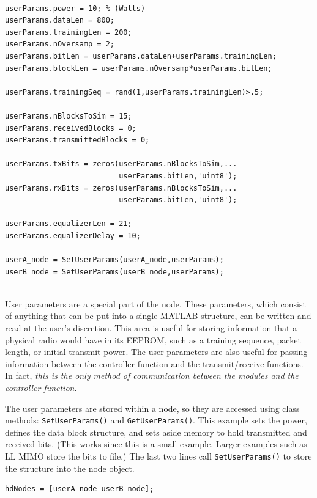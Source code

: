 \begin{lstlisting}[name=hdBuildNodes]
% Set user parameters

userParams.power = 10; % (Watts)
userParams.dataLen = 800;
userParams.trainingLen = 200;
userParams.nOversamp = 2;
userParams.bitLen = userParams.dataLen+userParams.trainingLen;
userParams.blockLen = userParams.nOversamp*userParams.bitLen;

userParams.trainingSeq = rand(1,userParams.trainingLen)>.5;

userParams.nBlocksToSim = 15;
userParams.receivedBlocks = 0;
userParams.transmittedBlocks = 0;

userParams.txBits = zeros(userParams.nBlocksToSim,...
                          userParams.bitLen,'uint8');
userParams.rxBits = zeros(userParams.nBlocksToSim,...
                          userParams.bitLen,'uint8');

userParams.equalizerLen = 21;
userParams.equalizerDelay = 10;

userA_node = SetUserParams(userA_node,userParams);
userB_node = SetUserParams(userB_node,userParams);


\end{lstlisting}

User parameters are a special part of the node.  These parameters,
which consist of anything that can be put into a single MATLAB
structure, can be written and read at the user's discretion.  This
area is useful for storing information that a physical radio would
have in its EEPROM, such as a training sequence, packet length, or
initial transmit power.  The user parameters are also useful for
passing information between the controller function and the
transmit/receive functions.  In fact, \emph{this is the only method
of communication between the modules and the controller function}.

The user parameters are stored within a node, so they are accessed
using class methods:  \verb+SetUserParams()+ and
\verb+GetUserParams()+. This example sets the power, defines the
data block structure, and sets aside memory to hold transmitted and
received bits.  (This works since this is a small example.  Larger
examples such as LL MIMO store the bits to file.)  The last two
lines call \verb+SetUserParams()+ to store the structure into the
node object.

\begin{lstlisting}[name=hdBuildNodes]
% Put user nodes into array
hdNodes = [userA_node userB_node];
\end{lstlisting}


